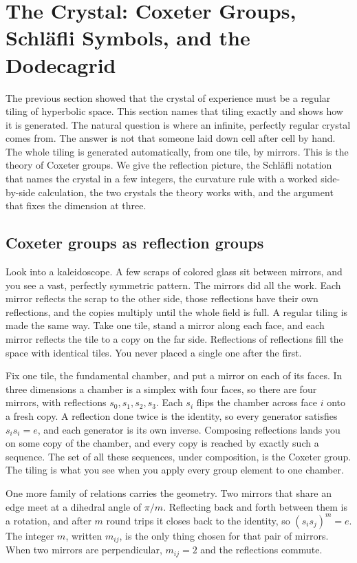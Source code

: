 \section{The Crystal: Coxeter Groups, Schl\"afli Symbols, and the Dodecagrid}

The previous section showed that the crystal of experience must be a regular tiling of hyperbolic space.
This section names that tiling exactly and shows how it is generated. The natural question is where an
infinite, perfectly regular crystal comes from. The answer is not that someone laid down cell after cell by
hand. The whole tiling is generated automatically, from one tile, by mirrors. This is the theory of Coxeter
groups. We give the reflection picture, the Schl\"afli notation that names the crystal in a few integers,
the curvature rule with a worked side-by-side calculation, the two crystals the theory works with, and the
argument that fixes the dimension at three.

\subsection{Coxeter groups as reflection groups}

Look into a kaleidoscope. A few scraps of colored glass sit between mirrors, and you see a vast, perfectly
symmetric pattern. The mirrors did all the work. Each mirror reflects the scrap to the other side, those
reflections have their own reflections, and the copies multiply until the whole field is full. A regular
tiling is made the same way. Take one tile, stand a mirror along each face, and each mirror reflects the
tile to a copy on the far side. Reflections of reflections fill the space with identical tiles. You never
placed a single one after the first.

Fix one tile, the fundamental chamber, and put a mirror on each of its faces. In three dimensions a chamber
is a simplex with four faces, so there are four mirrors, with reflections $s_0, s_1, s_2, s_3$. Each $s_i$
flips the chamber across face $i$ onto a fresh copy. A reflection done twice is the identity, so every
generator satisfies $s_i s_i = e$, and each generator is its own inverse. Composing reflections lands you on
some copy of the chamber, and every copy is reached by exactly such a sequence. The set of all these
sequences, under composition, is the Coxeter group. The tiling is what you see when you apply every group
element to one chamber.

One more family of relations carries the geometry. Two mirrors that share an edge meet at a dihedral angle
of $\pi / m$. Reflecting back and forth between them is a rotation, and after $m$ round trips it closes back
to the identity, so $(s_i s_j)^m = e$. The integer $m$, written $m_{ij}$, is the only thing chosen for that
pair of mirrors. When two mirrors are perpendicular, $m_{ij} = 2$ and the reflections commute.

